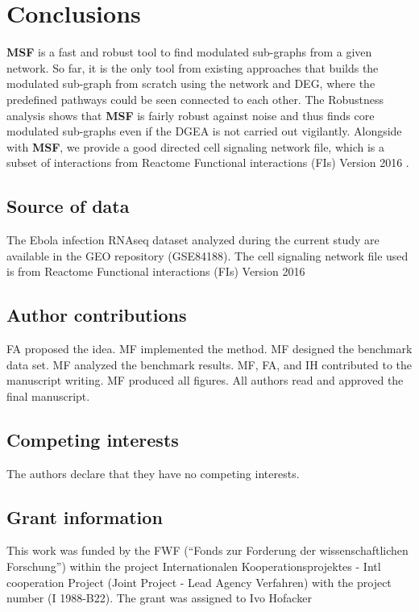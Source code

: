 \documentclass[10pt,a4paper,twocolumn]{article}
\begin{document}
\section*{Conclusions}

\textbf{MSF} is a fast and robust tool to find modulated sub-graphs
from a given network. So far, it is the only tool from existing
approaches that builds the modulated sub-graph from scratch using the
network and DEG, where the predefined pathways could be seen connected
to each other. The Robustness analysis shows that \textbf{MSF} is
fairly robust against noise and thus finds core modulated sub-graphs
even if the DGEA is not carried out vigilantly. Alongside with
\textbf{MSF}, we provide a good directed cell signaling network file,
which is a subset of interactions from Reactome Functional
interactions (FIs) Version 2016 .

\subsection*{Source of data}

The Ebola infection RNAseq dataset analyzed during the current study
are available in the GEO repository (GSE84188). The cell signaling
network file used is from Reactome Functional interactions (FIs)
Version 2016


\subsection*{Author contributions}
FA proposed the idea. MF implemented the method. MF designed the
benchmark data set. MF analyzed the benchmark results. MF, FA, and IH
contributed to the manuscript writing. MF produced all figures. All
authors read and approved the final manuscript.

\subsection*{Competing interests}

The authors declare that they have no competing interests.


\subsection*{Grant information}

This work was funded by the FWF (“Fonds zur Forderung der
wissenschaftlichen Forschung”) within the project Internationalen
Kooperationsprojektes - Intl cooperation Project (Joint Project - Lead
Agency Verfahren) with the project number (I 1988-B22). The grant was
assigned to Ivo Hofacker
\end{document}

